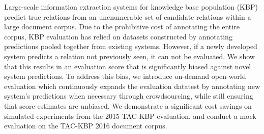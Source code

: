 Large-scale information extraction systems for knowledge base population (KBP) predict true relations from an unenumerable set of candidate relations within a large document corpus.
Due to the prohibitive cost of annotating the entire corpus, KBP evaluation has relied on datasets constructed by annotating predictions pooled together from existing systems.
However, if a newly developed system predicts a relation not previously seen, it can not be evaluated.
We show that this results in an evaluation score that is significantly biased against novel system predictions.
To address this bias,
  we introduce on-demand open-world evaluation which continuously expands the evaluation datatest by annotating new system's predictions when necessary through crowdsourcing, while still ensuring that score estimates are unbiased.
We demonstrate a significant cost savings on simulated experiments from the 2015 TAC-KBP evaluation, and conduct a mock evaluation on the TAC-KBP 2016 document corpus.

